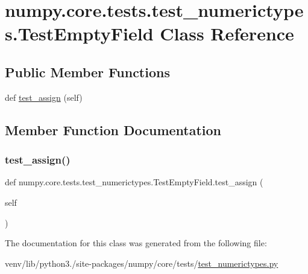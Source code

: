 \hypertarget{classnumpy_1_1core_1_1tests_1_1test__numerictypes_1_1TestEmptyField}{}\section{numpy.\+core.\+tests.\+test\+\_\+numerictypes.\+Test\+Empty\+Field Class Reference}
\label{classnumpy_1_1core_1_1tests_1_1test__numerictypes_1_1TestEmptyField}
\subsection*{Public Member Functions}
\begin{DoxyCompactItemize}
\item 
def \hyperlink{classnumpy_1_1core_1_1tests_1_1test__numerictypes_1_1TestEmptyField_aa16fc601d08085515498ffd369f9aa67}{test\+\_\+assign} (self)
\end{DoxyCompactItemize}


\subsection{Member Function Documentation}
\mbox{\label{classnumpy_1_1core_1_1tests_1_1test__numerictypes_1_1TestEmptyField_aa16fc601d08085515498ffd369f9aa67}} 
\subsubsection{\texorpdfstring{test\+\_\+assign()}{test\_assign()}}
{\footnotesize\ttfamily def numpy.\+core.\+tests.\+test\+\_\+numerictypes.\+Test\+Empty\+Field.\+test\+\_\+assign (\begin{DoxyParamCaption}\item[{}]{self }\end{DoxyParamCaption})}



The documentation for this class was generated from the following file\+:\begin{DoxyCompactItemize}
\item 
venv/lib/python3./site-\/packages/numpy/core/tests/\hyperlink{test__numerictypes_8py}{test\+\_\+numerictypes.\+py}\end{DoxyCompactItemize}

